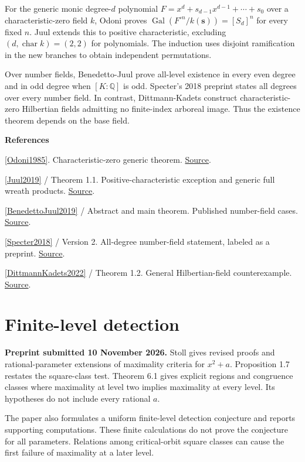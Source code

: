 \documentclass[11pt,a4paper,oneside,openany]{book}
\newenvironment{sources}{\par\smallskip\begingroup\footnotesize\color{atlasgray}\leftskip=10pt\setlength{\parskip}{2pt}}{\par\endgroup\smallskip}
\begin{document}
\color{black} For the generic monic degree-\(d\) polynomial \(F=x^d+s_{d-1}x^{d-1}+\cdots+s_0\) over a characteristic-zero field \(k\), Odoni proves \(\operatorname{Gal}(F^{\circ n}/k(\mathbf s))=[S_d]^n\) for every fixed \(n\). Juul extends this to positive characteristic, excluding \((d,\operatorname{char}k)=(2,2)\) for polynomials. The induction uses disjoint ramification in the new branches to obtain independent permutations.\par
\color{black} Over number fields, Benedetto-Juul prove all-level existence in every even degree and in odd degree when \([K:\mathbb Q]\) is odd. Specter's 2018 preprint states all degrees over every number field. In contrast, Dittmann-Kadets construct characteristic-zero Hilbertian fields admitting no finite-index arboreal image. Thus the existence theorem depends on the base field.\par
\begin{sources}
\textbf{References}\par\smallskip
\noindent\hyperlink{ref:Odoni1985}{[Odoni1985]}. Characteristic-zero generic theorem. \href{https://londmathsoc.onlinelibrary.wiley.com/doi/10.1112/plms/s3-51.3.385}{Source}.\par
\noindent\hyperlink{ref:Juul2019}{[Juul2019]} / Theorem 1.1. Positive-characteristic exception and generic full wreath products. \href{https://arxiv.org/abs/1410.3814}{Source}.\par
\noindent\hyperlink{ref:BenedettoJuul2019}{[BenedettoJuul2019]} / Abstract and main theorem. Published number-field cases. \href{https://londmathsoc.onlinelibrary.wiley.com/doi/10.1112/blms.12225}{Source}.\par
\noindent\hyperlink{ref:Specter2018}{[Specter2018]} / Version 2. All-degree number-field statement, labeled as a preprint. \href{https://arxiv.org/abs/1803.00434v2}{Source}.\par
\noindent\hyperlink{ref:DittmannKadets2022}{[DittmannKadets2022]} / Theorem 1.2. General Hilbertian-field counterexample. \href{https://arxiv.org/abs/2012.03076}{Source}.\par
\end{sources}\color{black}
\section{Finite-level detection}
\color{black} \textbf{Preprint submitted 10 November 2026.} Stoll gives revised proofs and rational-parameter extensions of maximality criteria for \(x^2+a\). Proposition 1.7 restates the square-class test. Theorem 6.1 gives explicit regions and congruence classes where maximality at level two implies maximality at every level. Its hypotheses do not include every rational \(a\).\par
\color{black} The paper also formulates a uniform finite-level detection conjecture and reports supporting computations. These finite calculations do not prove the conjecture for all parameters. Relations among critical-orbit square classes can cause the first failure of maximality at a later level.\par
\end{document}
